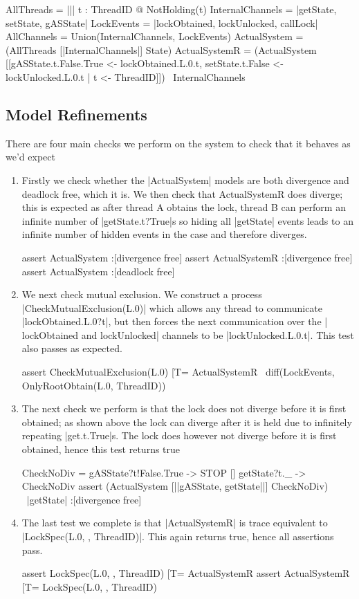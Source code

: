 \begin{cspm}
  AllThreads = ||| t : ThreadID @ NotHolding(t)
  InternalChannels = {|getState, setState, gASState|}
  LockEvents = {|lockObtained, lockUnlocked, callLock|}
  AllChannels = Union({InternalChannels, LockEvents})
  ActualSystem = (AllThreads [|InternalChannels|] State)
  ActualSystemR = (ActualSystem [[gASState.t.False.True <- lockObtained.L.0.t, setState.t.False <- lockUnlocked.L.0.t | t <- ThreadID]]) \ InternalChannels
\end{cspm}

\subsection{Model Refinements}

There are four main checks we perform on the system to check that it behaves as we'd expect
\begin{enumerate}
  \item Firstly we check whether the |ActualSystem| models are both divergence and deadlock free, which it is. We then check that ActualSystemR does diverge; this is expected as after thread A obtains the lock, thread B can perform an infinite number of |getState.t?True|s so hiding all |getState| events leads to an infinite number of hidden events in the case and therefore diverges.
\begin{cspm}
  assert ActualSystem :[divergence free]
  assert ActualSystemR :[divergence free]
  assert ActualSystem :[deadlock free]
\end{cspm}
\item We next check mutual exclusion. We construct a process |CheckMutualExclusion(L.0)| which allows any thread to communicate |lockObtained.L.0?t|, but then forces the next communication over the | lockObtained and lockUnlocked| channels to be |lockUnlocked.L.0.t|. This test also passes as expected.
\begin{cspm}
  assert CheckMutualExclusion(L.0) [T= ActualSystemR \ diff(LockEvents, OnlyRootObtain(L.0, ThreadID))
\end{cspm}
\item The next check we perform is that the lock does not diverge before it is first obtained; as shown above the lock can diverge after it is held due to infinitely repeating |get.t.True|s. The lock does however not diverge before it is first obtained, hence this test returns true
\begin{cspm}
  CheckNoDiv = gASState?t!False.True -> STOP
             [] getState?t._ -> CheckNoDiv
assert (ActualSystem [|{|gASState, getState|}|] CheckNoDiv) \ {|getState|} :[divergence free]
\end{cspm}
\item The last test we complete is that |ActualSystemR| is trace equivalent to |LockSpec(L.0, {}, ThreadID)|. This again returns true, hence all assertions pass.
\begin{cspm}
  assert LockSpec(L.0, {}, ThreadID) [T= ActualSystemR
  assert ActualSystemR [T= LockSpec(L.0, {}, ThreadID)
\end{cspm}
\end{enumerate}
